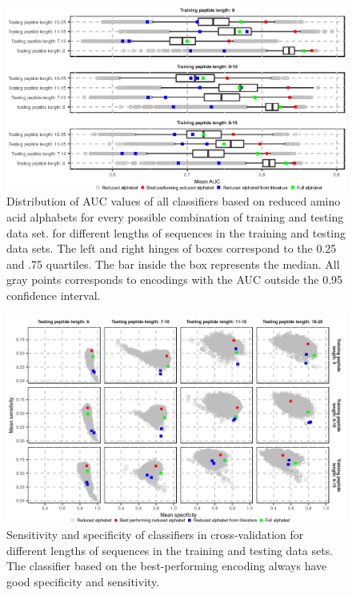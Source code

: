 \documentclass[a4,center,fleqn]{NAR}
\begin{document}
\begin{figure}[!tpb]
\centerline{\includegraphics{figures/AUC_boxplot.eps}}
\caption{Distribution of AUC values of all classifiers based on reduced amino acid 
alphabets for every possible combination of training and testing data set.
for different lengths of sequences in the training and testing data sets. 
The left and right hinges of boxes correspond to the 0.25 and .75 quartiles. 
The bar inside the box represents the median. All gray points corresponds to
encodings with the AUC outside the 0.95 confidence interval. 
}\label{fig:AUC_boxplot} 
\end{figure}


\begin{figure}[!tpb]
\centerline{\includegraphics{figures/sesp_plot.png}}
\caption{Sensitivity and specificity of classifiers in cross-validation for 
different lengths of sequences in the training and testing data sets.
The classifier based on the best-performing encoding always have 
good specificity and sensitivity.}\label{fig:sesp_plot}
\end{figure}
\end{document}

